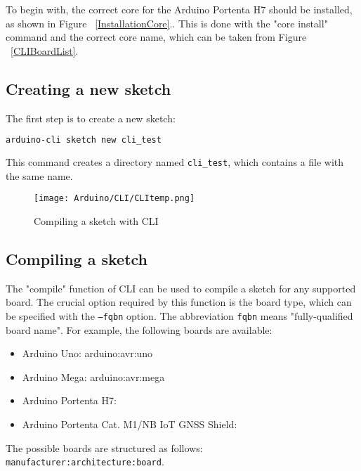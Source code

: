 To begin with, the correct core for the Arduino Portenta H7 should be installed, as shown in Figure ~\ref{InstallationCore}.. This is done with the "core install" command and the correct core name, which can be taken from Figure ~\ref{CLIBoardList}.

\subsection{Creating a new sketch}
The first step is to create a new sketch:
\begin{lstlisting}[language=bash]
    arduino-cli sketch new cli_test
\end{lstlisting}
This command creates a directory named \texttt{cli\_test}, which contains a file with the same name.
\begin{figure}
    \begin{center}
        \texttt{[image: Arduino/CLI/CLItemp.png]}
        \caption{Compiling a sketch with CLI }
        \label{CompileSketchCommand}
    \end{center}
\end{figure}

\subsection{Compiling a sketch}
The "compile" function of CLI can be used to compile a sketch for any supported board. The crucial option required by this function is the board type, which can be specified with the \texttt{--fqbn} option. The abbreviation \texttt{fqbn} means "fully-qualified board name". For example, the following boards are available:
\begin{itemize}
    \item Arduino Uno: arduino:avr:uno
    \item Arduino Mega: arduino:avr:mega
    \item Arduino Portenta H7:
    \item Arduino Portenta Cat. M1/NB IoT GNSS Shield:
    
\end{itemize}

The possible boards are structured as follows: 
\texttt{manufacturer:architecture:board}.


